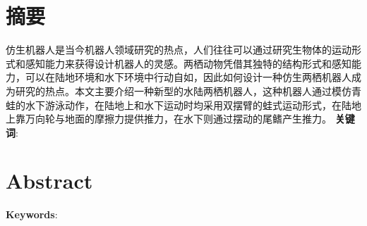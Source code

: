 \newpage
{}



\chapter*{摘要}

仿生机器人是当今机器人领域研究的热点，人们往往可以通过研究生物体的运动形式和感知能力来获得设计机器人的灵感。两栖动物凭借其独特的结构形式和感知能力，可以在陆地环境和水下环境中行动自如，因此如何设计一种仿生两栖机器人成为研究的热点。本文主要介绍一种新型的水陆两栖机器人，这种机器人通过模仿青蛙的水下游泳动作，在陆地上和水下运动时均采用双摆臂的蛙式运动形式，在陆地上靠万向轮与地面的摩擦力提供推力，在水下则通过摆动的尾鳍产生推力。
\vskip 0.3cm \textbf{关键词}: 
\newpage
\chapter*{Abstract}
\textbf{Keywords}: 